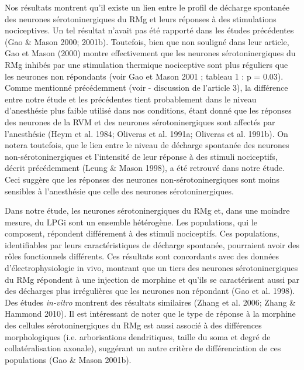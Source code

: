 \documentclass[a4paper,12pt,twoside]{report}
\begin{document}
Nos résultats montrent qu’il existe un lien entre le profil de décharge spontanée des neurones sérotoninergiques du RMg et leurs réponses à des stimulations nociceptives. Un tel résultat n’avait pas été rapporté dans les études précédentes (Gao \& Mason 2000; 2001b). Toutefois, bien que non souligné dans leur article, Gao et Mason (2000) montre effectivement que les neurones sérotoninergiques du RMg inhibés par une stimulation thermique nociceptive sont plus réguliers que les neurones non répondants (voir Gao et Mason 2001 ; tableau 1 : p = 0.03). Comme mentionné précédemment (voir - discussion de l’article 3), la différence entre notre étude et les précédentes tient probablement dans le niveau d’anesthésie plus faible utilisé dans nos conditions, étant donné que les réponses des neurones de la RVM et des neurones sérotoninergiques sont affectés par l’anesthésie (Heym et al. 1984; Oliveras et al. 1991a; Oliveras et al. 1991b). On notera toutefois, que le lien entre le niveau de décharge spontanée des neurones non-sérotoninergiques et l’intensité de leur réponse à des stimuli nociceptifs, décrit précédemment (Leung \& Mason 1998), a été retrouvé dans notre étude. Ceci suggère que les réponses des neurones non-sérotoninergiques sont moins sensibles à l’anesthésie que celle des neurones sérotoninergiques.

Dans notre étude, les neurones sérotoninergiques du RMg et, dans une moindre mesure, du LPGi sont un ensemble hétérogène. Les populations, qui le composent, répondent différement à des stimuli nociceptifs. Ces populations, identifiables par leurs caractéristiques de décharge spontanée, pourraient avoir des rôles fonctionnels différents. Ces résultats sont concordants avec des données d’électrophysiologie in vivo, montrant que un tiers des neurones sérotoninergiques du RMg répondent à une injection de morphine et qu’ils se caractérisent aussi par des décharges plus irrégulières que les neurones non répondant (Gao et al. 1998). Des études \textit{in-vitro} montrent des résultats similaires (Zhang et al. 2006; Zhang \& Hammond 2010). Il est intéressant de noter que le type de réponse à la morphine des cellules sérotoninergiques du RMg est aussi associé à des différences morphologiques (i.e. arborisations dendritiques, taille du soma et degré de collatéralisation axonale), suggérant un autre critère de différenciation de ces populations (Gao \& Mason 2001b).
\end{document}
